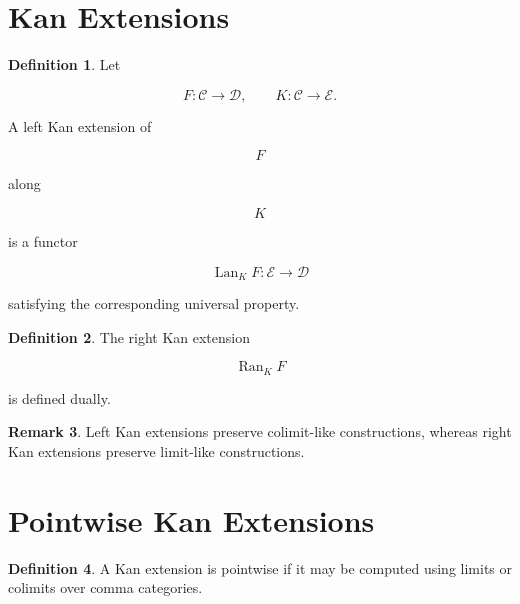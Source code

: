 \documentclass[11pt]{book}
\numberwithin{equation}{chapter}
\theoremstyle{definition}
\newtheorem{definition}{Definition}[chapter]
\newtheorem{remark}[definition]{Remark}
\theoremstyle{plain}
\begin{document}

\section{Kan Extensions}

\begin{definition}

Let

\[
F:\mathcal C\rightarrow\mathcal D,
\qquad
K:\mathcal C\rightarrow\mathcal E.
\]

A left Kan extension of

\[
F
\]

along

\[
K
\]

is a functor

\[
\operatorname{Lan}_K F
:
\mathcal E
\rightarrow
\mathcal D
\]

satisfying the corresponding universal property.

\end{definition}


\begin{definition}

The right Kan extension

\[
\operatorname{Ran}_K F
\]

is defined dually.

\end{definition}


\begin{remark}

Left Kan extensions preserve colimit-like constructions, whereas right
Kan extensions preserve limit-like constructions.

\end{remark}


\section{Pointwise Kan Extensions}

\begin{definition}

A Kan extension is pointwise if it may be computed using limits or
colimits over comma categories.

\end{definition}
\end{document}
